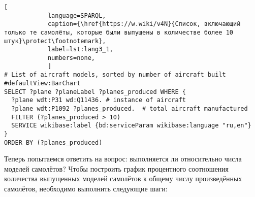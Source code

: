 \begin{lstlisting}[ 
            language=SPARQL, 
            caption={\href{https://w.wiki/v4N}{Список, включающий только те самолёты, которые были выпущены в количестве более 10 штук}\protect\footnotemark}, 
            label=lst:lang3_1, 
            numbers=none,
            ]
# List of aircraft models, sorted by number of aircraft built
#defaultView:BarChart
SELECT ?plane ?planeLabel ?planes_produced WHERE {
  ?plane wdt:P31 wd:Q11436. # instance of aircraft
  ?plane wdt:P1092 ?planes_produced.  # total aircraft manufactured
  FILTER (?planes_produced > 10)
  SERVICE wikibase:label {bd:serviceParam wikibase:language "ru,en"}
}
ORDER BY (?planes_produced)
\end{lstlisting}




\newpage 
Теперь 
 попытаемся ответить на вопрос: выполняется ли  относительно числа моделей самолётов?
Чтобы построить график процентного соотношения количества выпущенных моделей самолётов 
к общему числу произведённых самолётов, необходимо выполнить следующие шаги:



